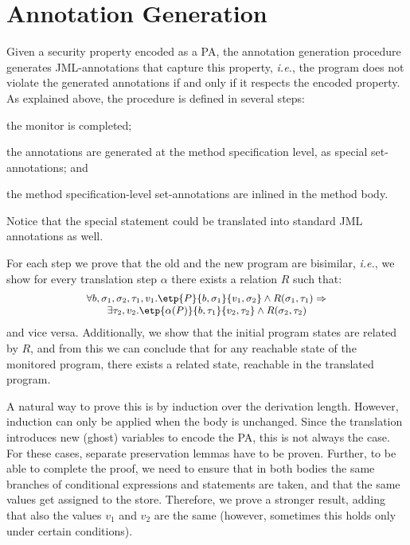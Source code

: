 \section{Annotation Generation}\label{SecAnnotGen}

Given a security property encoded as a PA, the annotation generation
procedure generates JML-annotations that capture this property,
\emph{i.e.}, the program does not violate the generated annotations
if and only if it respects the encoded property.
As explained above, the procedure is defined in several steps:
\begin{inparaenum}
\item the monitor is completed; %
\item the annotations are generated at the method specification level,
as special set-annotations; and
\item the method specification-level set-annotations are inlined in
the method body.
\end{inparaenum}
Notice that the special \CaseJML statement could be translated into
standard JML annotations as well.

For each step we prove that the old and the new program are bisimilar,
\emph{i.e.}, we show for every translation step
\(\alpha\) there exists a relation \(R\) such that:
\[{\small
\begin{array}{l}
\forall b, \sigma_1, \sigma_2, \tau_1, v_1.
\etp{P}{b,\sigma_1}{v_1, \sigma_2} \wedge
R(\sigma_1, \tau_1) \Rightarrow \\
\qquad
\exists \tau_2, v_2.
\etp{\alpha(P)}{b, \tau_1}{v_2, \tau_2} \wedge
R(\sigma_2, \tau_2)
\end{array}}
\]
and vice versa. Additionally, we show that the initial program states
are related by \(R\), and from this we can conclude that for any
reachable state of the monitored program, there exists a related state,
reachable in the translated program.

A natural way to prove this is by induction over the derivation
length.  However, induction can only be applied when the body is
unchanged. Since the translation introduces new (ghost) variables to
encode the PA, this is not always the case. For these cases, separate
preservation lemmas have to be proven.  Further, to be able to
complete the proof, we need to ensure that in both bodies the same
branches of conditional expressions and statements are taken, and that
the same values get assigned to the store. Therefore, we prove a
stronger result, adding that also the values %
\(v_1\) and \(v_2\) are the same (however, sometimes this holds only
under certain conditions).

